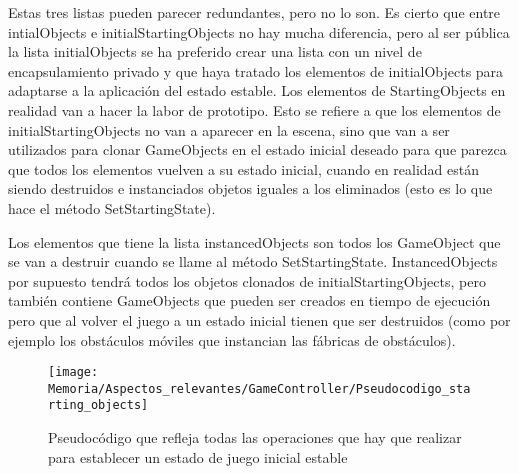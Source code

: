 Estas tres listas pueden parecer redundantes, pero no lo son. Es cierto que entre intialObjects e initialStartingObjects no hay mucha diferencia, pero al ser pública la lista initialObjects se ha preferido crear una lista con un nivel de encapsulamiento privado y que haya tratado los elementos de initialObjects para adaptarse a la aplicación del estado estable. Los elementos de StartingObjects en realidad van a hacer la labor de prototipo. Esto se refiere a que los elementos de initialStartingObjects no van a aparecer en la escena, sino que van a ser utilizados para clonar GameObjects en el estado inicial deseado para que parezca que todos los elementos vuelven a su estado inicial, cuando en realidad están siendo destruidos e instanciados objetos iguales a los eliminados (esto es lo que hace el método SetStartingState).

Los elementos que tiene la lista instancedObjects son todos los GameObject que se van a destruir cuando se llame al método SetStartingState. InstancedObjects por supuesto tendrá todos los objetos clonados de initialStartingObjects, pero también contiene GameObjects que pueden ser creados en tiempo de ejecución pero que al volver el juego a un estado inicial tienen que ser destruidos (como por ejemplo los obstáculos móviles que instancian las fábricas de obstáculos).

\begin{figure}[h]
\texttt{[image: Memoria/Aspectos\_relevantes/GameController/Pseudocodigo\_starting\_objects]}
\caption{Pseudocódigo que refleja todas las operaciones que hay que realizar para establecer un estado de juego inicial estable}
\end{figure}

